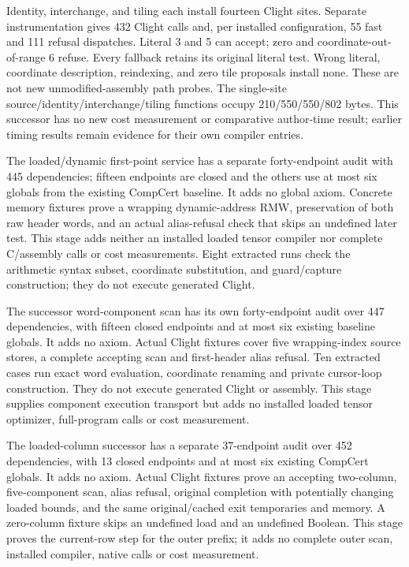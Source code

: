 Identity, interchange, and tiling each install fourteen Clight sites.
Separate instrumentation gives 432 Clight calls and, per installed
configuration, 55 fast and 111 refusal dispatches. Literal 3 and 5 can accept;
zero and coordinate-out-of-range 6 refuse. Every fallback retains its original
literal test. Wrong literal, coordinate description, reindexing, and zero tile
proposals install none. These are not new unmodified-assembly path probes.
The single-site source/identity/interchange/tiling functions occupy
210/550/550/802 bytes. This successor has no new cost measurement or comparative
author-time result; earlier timing results remain evidence for their own
compiler entries.

The loaded/dynamic first-point service has a separate forty-endpoint audit with
445 dependencies; fifteen endpoints are closed and the others use at most six
globals from the existing CompCert baseline. It adds no global axiom.
Concrete memory fixtures prove a wrapping dynamic-address RMW, preservation of
both raw header words, and an actual alias-refusal check that skips an undefined
later test. This stage adds neither an installed loaded tensor compiler nor
complete C/assembly calls or cost measurements.
Eight extracted runs check the arithmetic syntax subset, coordinate
substitution, and guard/capture construction; they do not execute generated Clight.

The successor word-component scan has its own forty-endpoint audit over 447
dependencies, with fifteen closed endpoints and at most six existing baseline
globals. It adds no axiom. Actual Clight fixtures cover five wrapping-index
source stores, a complete accepting scan and first-header alias refusal.
Ten extracted cases run exact word evaluation, coordinate renaming and private
cursor-loop construction. They do not execute generated Clight or assembly.
This stage supplies component execution transport but adds no installed loaded
tensor optimizer, full-program calls or cost measurement.

The loaded-column successor has a separate 37-endpoint audit over 452
dependencies, with 13 closed endpoints and at most six existing CompCert
globals. It adds no axiom. Actual Clight fixtures prove an accepting two-column,
five-component scan, alias refusal, original completion with potentially
changing loaded bounds, and the same original/cached exit temporaries and memory.
A zero-column fixture skips an undefined load and an undefined Boolean.
This stage proves the current-row step for the outer prefix; it adds no complete
outer scan, installed compiler, native calls or cost measurement.

